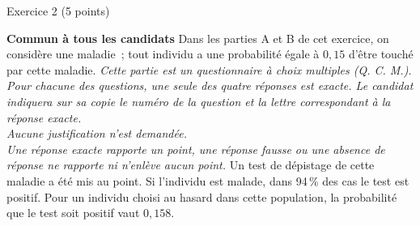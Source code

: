 
\begin{h2}Exercice 2 (5 points)\end{h2}
\textbf{Commun  à tous les candidats}
\bigbreak
Dans les parties A et B de cet exercice, on considère une maladie~; tout individu a une probabilité égale à $0,15$ d'être touché par cette maladie.
\bigbreak
{}
\medbreak
\emph{Cette partie est un questionnaire à choix multiples (Q. C. M.). Pour chacune des questions, une seule des quatre réponses est exacte. Le candidat indiquera sur sa copie le numéro de la question et la lettre correspondant à la réponse exacte. \\Aucune justification n'est demandée. \\Une réponse exacte rapporte un point, une réponse fausse ou une absence de réponse ne rapporte ni n'enlève aucun point.}
\medbreak
Un test de dépistage de cette maladie a été mis au point. Si l'individu est malade, dans 94\,\% des cas le test est positif. Pour un individu choisi au hasard dans cette population, la probabilité que le test soit positif vaut $0,158$.
\medbreak
